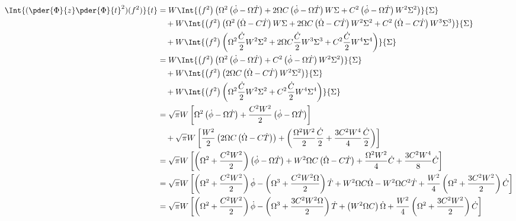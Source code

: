\begin{equation}
\begin{split}
 \Int{ (\pder{\Phi}{z} \pder{\Phi}{t}^2)(f^2)  }{t}  &= W \Int{\left( f^2\right) \left(\Omega^2  \left(\dot{\phi}- \Omega\dot{T}\right) +  2\Omega C  \left(\dot{\phi}- \Omega\dot{T}\right)W \Sigma + C^2  \left(\dot{\phi}- \Omega\dot{T}\right) W^2 \Sigma^2\right)}{\Sigma}\\
 &\quad +  W \Int{\left( f^2\right) \left(\Omega^2 \left(\dot{\Omega}- C\dot{T}\right) W\Sigma  +  2 \Omega C \left(\dot{\Omega}- C\dot{T}\right) W^2 \Sigma^2 + C^2 \left(\dot{\Omega}- C\dot{T}\right)W^3 \Sigma^3 \right)}{\Sigma}\\
&\quad  +  W \Int{\left( f^2\right) \left(\Omega^2 \frac{\dot{C}}{2}W^2 \Sigma^2  +  2 \Omega C \frac{\dot{C}}{2}W^3 \Sigma^3 + C^2 \frac{\dot{C}}{2}W^4 \Sigma^4 \right)}{\Sigma}\\
&= W \Int{\left( f^2\right) \left(\Omega^2  \left(\dot{\phi}- \Omega\dot{T}\right) + C^2  \left(\dot{\phi}- \Omega\dot{T}\right) W^2 \Sigma^2\right)}{\Sigma}\\
 &\quad +  W \Int{\left( f^2\right) \left( 2 \Omega C \left(\dot{\Omega}- C\dot{T}\right) W^2 \Sigma^2 \right)}{\Sigma}\\
&\quad  +  W \Int{\left( f^2\right) \left(\Omega^2 \frac{\dot{C}}{2}W^2 \Sigma^2  + C^2 \frac{\dot{C}}{2}W^4 \Sigma^4 \right)}{\Sigma}\\
&= \sqrt{\pi} W \left[ \Omega^2  \left(\dot{\phi} - \Omega\dot{T}\right) + \frac{C^2W^2}{2}  \left(\dot{\phi} -  \Omega\dot{T}\right) \right]\\
&\quad +  \sqrt{\pi} W  \left[  \frac{W^2}{2} \left( 2 \Omega C \left(\dot{\Omega}- C\dot{T}\right) \right) + \left(\frac{\Omega^2 W^2}{2} \frac{\dot{C}}{2}   + \frac{3C^2W^4}{4} \frac{\dot{C}}{2} \right)\right]\\
&= \sqrt{\pi} W \left[ \left(\Omega^2   + \frac{C^2W^2}{2}\right)  \left(\dot{\phi}- \Omega\dot{T}\right)  + W^2\Omega C \left(\dot{\Omega}- C\dot{T}\right) + \frac{\Omega^2 W^2}{4}\dot{C}  + \frac{3C^2W^4}{8}\dot{C}\right]\\
&= \sqrt{\pi} W \left[ \left(\Omega^2   + \frac{C^2W^2}{2}\right) \dot{\phi}-\left(\Omega^3   + \frac{C^2W^2\Omega}{2}\right) \dot{T}  + W^2\Omega C \dot{\Omega}-W^2\Omega C^2\dot{T} + \frac{W^2}{4}\left(\Omega^2 + \frac{3C^2W^2}{2}\right)\dot{C}\right]\\
&= \sqrt{\pi} W \left[ \left(\Omega^2   + \frac{C^2W^2}{2}\right) \dot{\phi} - \left(\Omega^3   + \frac{3C^2W^2\Omega}{2}\right) \dot{T}  + \left(W^2\Omega C\right) \dot{\Omega} + \frac{W^2}{4}\left(\Omega^2 + \frac{3C^2W^2}{2}\right)\dot{C}\right]\\
\end{split}
\end{equation}

